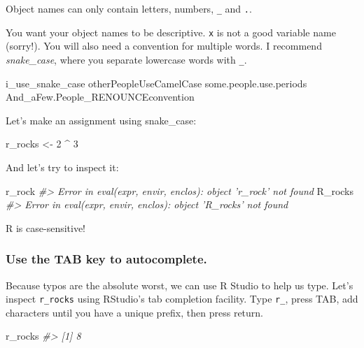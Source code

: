 \documentclass[]{book}
\newenvironment{Shaded}{\begin{snugshade}}{\end{snugshade}}
\newcommand{\DecValTok}[1]{\textcolor[rgb]{0.00,0.00,0.81}{#1}}
\newcommand{\StringTok}[1]{\textcolor[rgb]{0.31,0.60,0.02}{#1}}
\newcommand{\CommentTok}[1]{\textcolor[rgb]{0.56,0.35,0.01}{\textit{#1}}}
\newcommand{\OperatorTok}[1]{\textcolor[rgb]{0.81,0.36,0.00}{\textbf{#1}}}
\newcommand{\NormalTok}[1]{#1}
\begin{document}
Object names can only contain letters, numbers, \texttt{\_} and
\texttt{.}.

You want your object names to be descriptive. \texttt{x} is not a good
variable name (sorry!). You will also need a convention for multiple
words. I recommend \emph{snake\_case}, where you separate lowercase
words with \texttt{\_}.

\begin{Shaded}
\begin{Highlighting}[]
\NormalTok{i_use_snake_case}
\NormalTok{otherPeopleUseCamelCase}
\NormalTok{some.people.use.periods}
\NormalTok{And_aFew.People_RENOUNCEconvention}
\end{Highlighting}
\end{Shaded}

Let's make an assignment using snake\_case:

\begin{Shaded}
\begin{Highlighting}[]
\NormalTok{r_rocks <-}\StringTok{ }\DecValTok{2} \OperatorTok{^}\StringTok{ }\DecValTok{3}
\end{Highlighting}
\end{Shaded}

And let's try to inspect it:

\begin{Shaded}
\begin{Highlighting}[]
\NormalTok{r_rock}
\CommentTok{#> Error in eval(expr, envir, enclos): object 'r_rock' not found}
\NormalTok{R_rocks}
\CommentTok{#> Error in eval(expr, envir, enclos): object 'R_rocks' not found}
\end{Highlighting}
\end{Shaded}

R is case-sensitive!

\subsubsection*{Use the TAB key to
autocomplete.}\label{use-the-tab-key-to-autocomplete.}

Because typos are the absolute worst, we can use R Studio to help us
type. Let's inspect \texttt{r\_rocks} using RStudio's tab completion
facility. Type \texttt{r\_}, press TAB, add characters until you have a
unique prefix, then press return.

\begin{Shaded}
\begin{Highlighting}[]
\NormalTok{r_rocks}
\CommentTok{#> [1] 8}
\end{Highlighting}
\end{Shaded}
\end{document}

